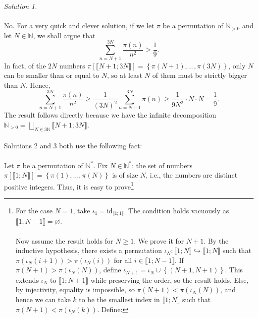 \begin{solution}
    \textit{Solution 1.}
    \\\\
    No. For a very quick and clever solution, if we let \( \pi \) be a permutation of \( \mathbb{N}_{>0} \) and let \( N \in \mathbb{N} \), we shall argue that
    \[
        \sum_{n=N+1}^{3N} \frac{\pi\left(n\right)}{n^2} > \frac{1}{9}.
    \]
    In fact, of the \( 2N \) numbers \( \pi\left[\llbracket N+1;3N\rrbracket\right]=\left\{\pi\left(N+1\right), \ldots, \pi\left(3N\right)\right\} \), only \( N \) can be smaller than or equal to \( N \), so at least \( N \) of them must be strictly bigger than \( N \). Hence,
    \[
        \sum_{n=N+1}^{3N} \frac{\pi\left(n\right)}{n^2} \geq \frac{1}{\left(3N\right)^2} \sum_{n=N+1}^{3N} \pi\left(n\right) \geq \frac{1}{9N^2} \cdot N \cdot N = \frac{1}{9}.
    \]
    The result follows directly because we have the infinite decomposition \( \mathbb{N}_{>0}= \bigsqcup_{N\in 3\mathbb{N}} \llbracket N+1;3N \rrbracket \).
    \\\\
    Solutions 2 and 3 both use the following fact:
    \\\\
    Let \( \pi \) be a permutation of \( \mathbb{N}^{*} \). Fix \( N \in \mathbb{N}^{*} \): the set of numbers \( \pi\left[\llbracket 1;N \rrbracket\right] = \left\{\pi\left(1\right), \ldots, \pi\left(N\right)\right\} \) is of size \( N \), i.e., the numbers are distinct positive integers. Thus, it is easy to prove\footnote{For the case \( N=1 \), take \( \iota_1 = \mathrm{id}_{\llbracket 1;1 \rrbracket} \). The condition holds vacuously as \( \llbracket 1;N-1 \rrbracket = \varnothing \).
    \\\\
    Now assume the result holds for \( N \geq 1 \). We prove it for \( N+1 \). By the inductive hypothesis, there exists a permutation \( \iota_N \colon \llbracket 1;N \rrbracket \hookrightarrow \llbracket 1;N \rrbracket \) such that \( \pi\left(\iota_N\left(i+1\right)\right) > \pi\left(\iota_N\left(i\right)\right) \) for all \( i \in \llbracket 1;N-1 \rrbracket \). If \( \pi\left(N+1\right) > \pi\left(\iota_N\left(N\right)\right) \), define \( \iota_{N+1} = \iota_N \cup \left\{\left(N+1, N+1\right)\right\} \). This extends \( \iota_N \) to \( \llbracket 1;N+1 \rrbracket \) while preserving the order, so the result holds. Else, by injectivity, equality is impossible, so \( \pi\left(N+1\right) < \pi\left(\iota_N\left(N\right)\right) \), and hence we can take \( k \) to be the smallest index in \( \llbracket 1;N \rrbracket \) such that \( \pi\left(N+1\right) < \pi\left(\iota_N\left(k\right)\right) \). Define:
}
\end{solution}

